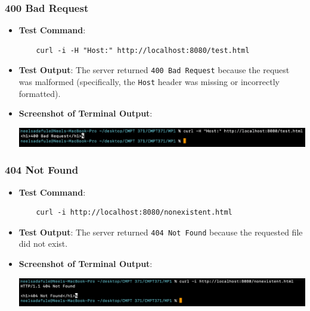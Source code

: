 \documentclass{article}
\begin{document}
\subsubsection*{400 Bad Request}
\begin{itemize}
    \item \textbf{Test Command}:
    \begin{lstlisting}
    curl -i -H "Host:" http://localhost:8080/test.html
    \end{lstlisting}

    \item \textbf{Test Output}: The server returned \texttt{400 Bad Request} because the request was malformed (specifically, the \texttt{Host} header was missing or incorrectly formatted).

    \item \textbf{Screenshot of Terminal Output}:
    \begin{center}
        \includegraphics[width=\textwidth]{screenshots/400_Bad_Request.png}  %
    \end{center}
\end{itemize}

\subsubsection*{404 Not Found}
\begin{itemize}
    \item \textbf{Test Command}:
    \begin{lstlisting}
    curl -i http://localhost:8080/nonexistent.html
    \end{lstlisting}

    \item \textbf{Test Output}: The server returned \texttt{404 Not Found} because the requested file did not exist.

    \item \textbf{Screenshot of Terminal Output}:
    \begin{center}
        \includegraphics[width=\textwidth]{screenshots/404_Not_Found.png}  %
    \end{center}
\end{itemize}
\end{document}
